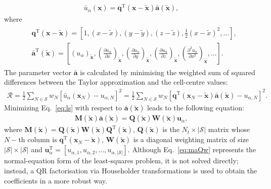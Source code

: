 \documentclass[review,3p]{elsarticle}
\newcommand{\bb}{\boldsymbol}
\begin{document}
%
\begin{eqnarray}
	\bar{u}_\alpha(\bb{x}) = \mathbf{q}^{\mathrm{T}}(\bb{x}-\tilde{\bb{x}})\bar{\mathbf{a}}(\tilde{\bb{x}}),
\end{eqnarray}
%
where
%
\begin{eqnarray}\label{eq:qAnda}
	\begin{split}
		&\mathbf{q}^{\mathrm{T}}(\bb{x}-\tilde{\bb{x}}) = \left[1, (x-\tilde{x}), (y-\tilde{y}), (z-\tilde{z}), \frac{1}{2}(x-\tilde{x})^2, \dots \right],\\
		& \bar{\mathbf{a}}^{\mathrm{T}}(\tilde{\bb{x}}) = \left[(u_\alpha)_{\tilde{\bb{x}}}, \left(\frac{\partial u_\alpha}{\partial x}\right)_{\tilde{\bb{x}}},
		\left(\frac{\partial u_\alpha}{\partial y}\right)_{\tilde{\bb{x}}},
		\left(\frac{\partial u_\alpha}{\partial z}\right)_{\tilde{\bb{x}}},
		\left(\frac{\partial^2 u_\alpha}{\partial x^2}\right)_{\tilde{\bb{x}}},
		\dots  \right].
	\end{split}
\end{eqnarray}
%
The parameter vector $\bar{\mathbf{a}}$ is calculated by minimising the weighted sum of squared differences between the Taylor approximation and the cell-centre values:
%
\begin{eqnarray}\label{eq:ls}
	\mathcal{R} = \frac{1}{2} \sum_{N \in \mathcal{S}} w_N \left [ \bar{u}_\alpha(\bb{x}_N) - u_{\alpha,N}\right]^2 =\frac{1}{2} \sum_{N \in \mathcal{S}} w_N \left [ \mathbf{q}^{\mathrm{T}}(\bb{x}_N-\tilde{\bb{x}})\bar{\mathbf{a}}(\tilde{\bb{x}}) - u_{\alpha,N}\right]^2.
\end{eqnarray}
%
Minimizing Eq.~\eqref{eq:ls} with respect to $\bar{\mathbf{a}}(\tilde{\boldsymbol{x}})$ leads to the following equation:
%
\begin{eqnarray}\label{eq:maQw}
	\mathbf{{M}}(\tilde{\bb{x}}) \mathbf{\bar{a}}(\tilde{\bb{x}}) = \mathbf{{Q}}(\tilde{\bb{x}}) \mathbf{{W}}(\tilde{\bb{x}}) \mathbf{u}_\alpha,
\end{eqnarray}
%
where $\mathbf{M}(\tilde{\bb{x}})=\mathbf{Q}(\tilde{\bb{x}})\mathbf{W}(\tilde{\bb{x}})\mathbf{Q}^{\mathrm{T}}(\tilde{\bb{x}})$, $\mathbf{Q}(\tilde{\bb{x}})$ is the $N_t \times |\mathcal{S}|$ matrix whose $N-$th column is $\mathbf{q}^{\mathrm{T}}(\bb{x}_N-\tilde{\bb{x}})$, $\mathbf{W}(\tilde{\bb{x}})$ is a diagonal weighting matrix of size $|\mathcal{S}| \times |\mathcal{S}|$ and $\mathbf{u}^\text{T}_\alpha=\left[u_{\alpha,1}, u_{\alpha,2},\dots,u_{\alpha,|\mathcal{S}|} \right] $.
Although Eq.~\eqref{eq:maQw} represents the normal-equation form of the least-squares problem, it is not solved directly; instead, a QR factorisation via Householder transformations \cite{strang2012} is used to obtain the coefficients in a more robust way.
\end{document}
